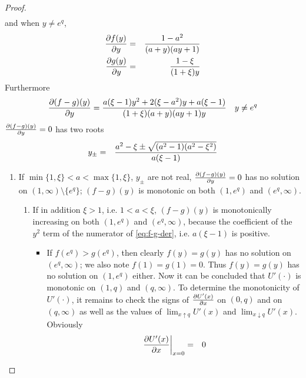 \documentclass[11pt,a4]{amsart}
\newcommand{\pd}{\partial}
\newcommand{\1}{{\mathbf 1}}
\begin{document}
\begin{proof}
\begin{eqnarray}
  \end{eqnarray}
  and when $y \neq e^q$,
  \begin{eqnarray}
    {\pd f(y) \over \pd y} &=& {1 - a^2 \over (a + y) (a y + 1)}
    \label{eq:fd}\\
    {\pd g(y) \over \pd y} &=& {1 - \xi \over (1 + \xi) y}
    \label{eq:gd}
  \end{eqnarray}
  Furthermore
  \begin{equation}
    \label{eq:f-g-der}
    {\pd (f -g)(y) \over \pd y} = {
      a (\xi - 1) y^2 + 2 (\xi - a^2) y + a(\xi - 1)
      \over
      (1 + \xi) (a + y) (a y + 1) y
    }
    \quad
    y \neq e^q
  \end{equation}
  ${\pd (f -g)(y) \over \pd y} = 0$ has two roots
  \begin{eqnarray*}
    y_\pm &=& {
      a^2 - \xi \pm \sqrt{(a^2 - 1) (a^2 - \xi^2)}
      \over
      a (\xi - 1)
    }
  \end{eqnarray*}
  \begin{enumerate}
  \item If $\min\{1, \xi\} < a < \max\{1, \xi\}$, $y_\pm$ are not
    real, ${\pd (f -g)(y) \over \pd y} = 0$ has no solution on $(1,
    \infty)\setminus \{e^q\}$; $(f -g)(y)$ is monotonic on both
    $(1, e^q)$ and $(e^q, \infty)$.
    \begin{enumerate}
    \item If in addition $\xi > 1$, i.e. $1 < a < \xi$, $(f - g)(y)$
      is monotonically increasing on both
      $(1, e^q)$ and $(e^q, \infty)$, because the coefficient of the
      $y^2$ term of the numerator of \eqref{eq:f-g-der}, i.e. $a (\xi
      - 1)$ is positive.
      \begin{itemize}
      \item If $f(e^q) > g(e^q)$, then clearly $f(y) = g(y)$ has no
        solution on $(e^q, \infty)$; we also note $f(1) = g(1) =
        0$. Thus $f(y) = g(y)$ has no solution on $(1, e^q)$ either.
        Now it can be concluded that $U'(\cdot)$ is monotonic on
        $(1, q)$ and $(q, \infty)$. To determine the monotonicity of
        $U'(\cdot)$, it remains to check the signs of
        ${\pd U'(x) \over \pd x}$  on  $(0, q)$ and on $(q, \infty)$
        as well as the values of $\lim_{x \uparrow q} U'(x)$ and
        $\lim_{x \downarrow q} U'(x)$. Obviously
        \begin{eqnarray*}
          \left.{\pd U'(x) \over \pd x}\right|_{x=0} &=& 0 \\
        \end{eqnarray*}

\end{itemize}
\end{enumerate}
\end{enumerate}
\end{proof}
\end{document}
